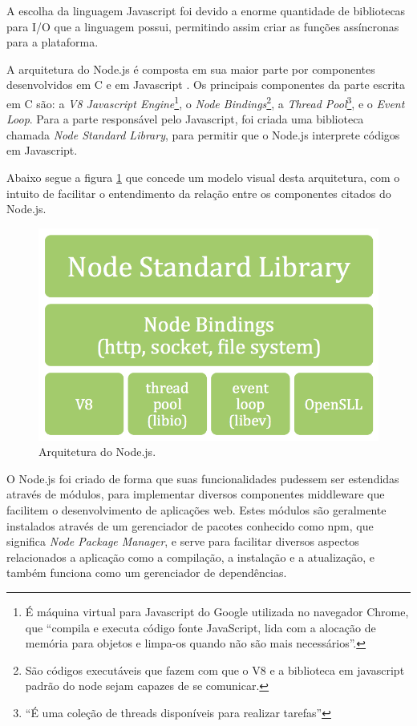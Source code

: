 A escolha da linguagem Javascript foi devido a enorme quantidade de bibliotecas para I/O que a linguagem possui, permitindo assim criar as funções assíncronas para a plataforma.

A arquitetura do Node.js é composta em sua maior parte por componentes  desenvolvidos em C e em Javascript \nocite{nodeInAction}. Os principais componentes da parte escrita em C são: a \textit{V8 Javascript Engine}\footnote{É máquina virtual para Javascript do Google utilizada no navegador Chrome, que ``compila e executa código fonte JavaScript, lida com a alocação de memória para objetos e limpa-os quando não são mais necessários''\cite{v8Eng}.}, o \textit{Node Bindings}\footnote{São códigos executáveis que fazem com que o V8 e a biblioteca em javascript padrão do node sejam capazes de se comunicar.}, a  \textit{Thread Pool}\footnote{``É uma coleção de threads disponíveis para realizar tarefas''\cite{ThreadPool}}, e o \textit{Event Loop}. Para a parte responsável pelo Javascript, foi criada uma biblioteca chamada \textit{Node Standard Library}, para permitir que o Node.js interprete códigos em Javascript.

Abaixo segue a figura \ref{fig:Arquitetura do Node.js} \cite{nodeMeet} que concede um modelo visual desta arquitetura, com o intuito de facilitar o entendimento da relação entre os componentes citados do Node.js.

\begin{figure}[htb]
\centering
\includegraphics[scale=0.4]{images/node_platform.png}
\caption{Arquitetura do Node.js.}
\label{fig:Arquitetura do Node.js}
\end{figure}
    
    O Node.js foi criado de forma que suas funcionalidades pudessem ser estendidas através de módulos, para implementar diversos componentes middleware que facilitem o desenvolvimento de aplicações web. Estes módulos são geralmente instalados através de um gerenciador de pacotes conhecido como npm, que significa \textit{Node Package Manager}, e serve para facilitar diversos aspectos relacionados a aplicação como a compilação, a instalação e a atualização, e também funciona como um gerenciador de dependências.


